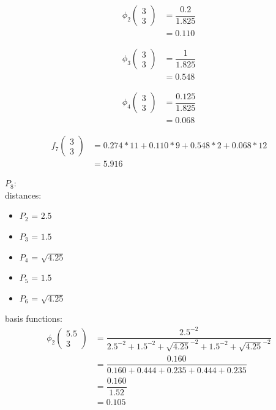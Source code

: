 \documentclass[a4paper]{article}
\begin{document}
\begin{align*}
\phi_{2}
\begin{pmatrix}
3 \\
3
\end{pmatrix}
& = \dfrac{0.2}{1.825}\\
& = 0.110
\end{align*}

\begin{align*}
\phi_{3}
\begin{pmatrix}
3 \\
3
\end{pmatrix}
& = \dfrac{1}{1.825}\\
& = 0.548
\end{align*}

\begin{align*}
\phi_{4}
\begin{pmatrix}
3 \\
3
\end{pmatrix}
& = \dfrac{0.125}{1.825}\\
& = 0.068
\end{align*}

\begin{align*}
f_{7}
\begin{pmatrix}
3 \\
3
\end{pmatrix}
& = 0.274 * 11 + 0.110 * 9 + 0.548 * 2 + 0.068 * 12\\
& = 5.916
\end{align*}

$ P_8 $:\\
distances:
\begin{itemize}
	\item $ P_2 $ = $ 2.5 $
	\item $ P_3 $ = $ 1.5 $
	\item $ P_4 $ = $ \sqrt{4.25} $
	\item $ P_5 $ = $ 1.5 $
	\item $ P_6 $ = $ \sqrt{4.25} $
\end{itemize}

basis functions:
\begin{align*}
\phi_{2}
\begin{pmatrix}
5.5 \\
3
\end{pmatrix}
& =
\dfrac{
	2.5^{-2}
}{
	2.5^{-2}
	+
	1.5^{-2}
	+
	\sqrt{4.25}^{-2}
	+
	1.5^{-2}
	+
	\sqrt{4.25}^{-2}
} \\
& = \dfrac{0.160}{0.160 + 0.444 + 0.235 + 0.444 + 0.235}\\
& = \dfrac{0.160}{1.52}\\
& = 0.105
\end{align*}
\end{document}
